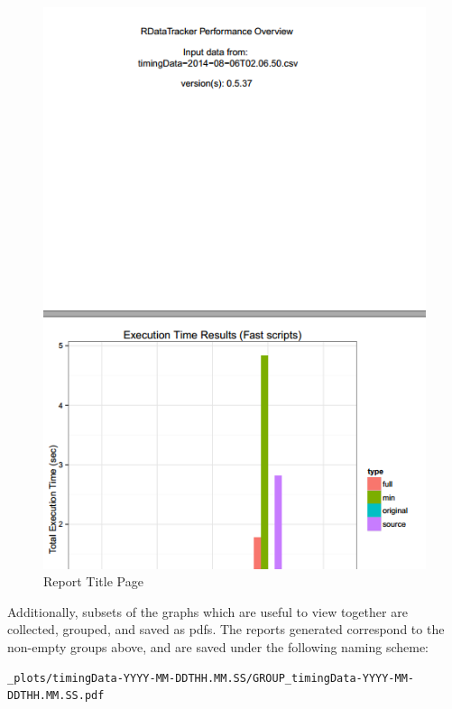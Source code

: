 \documentclass[12pt]{article}
\begin{document}
\begin{enumerate}
\begin{figure}[!ht]
\caption{Report Title Page}
\begin{center}
\includegraphics[scale=0.7]{UsingRDataTrackerTests-img/report-example.PNG}
\end{center}
\label{fig:report_example}
\end{figure}

Additionally, subsets of the graphs which are useful to view together are collected, grouped, and saved as pdfs. The reports generated correspond to the non-empty groups above, and are saved under the following naming scheme:
\begin{lstlisting}
_plots/timingData-YYYY-MM-DDTHH.MM.SS/GROUP_timingData-YYYY-MM-DDTHH.MM.SS.pdf
\end{lstlisting} 


\end{enumerate}
\end{document}
